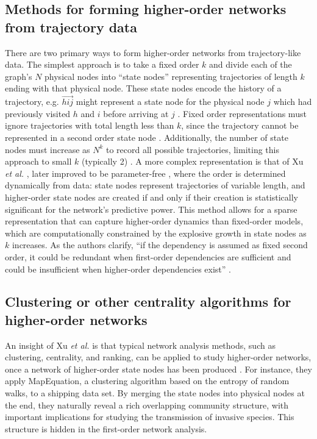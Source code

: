 \documentclass[sigconf]{acmart}
\begin{document}
\subsection{Methods for forming higher-order networks from trajectory data}

There are two primary ways to form higher-order networks from trajectory-like data. The simplest approach is to take a fixed order $k$ and divide each of the graph's $N$ physical nodes into ``state nodes'' representing trajectories of length $k$ ending with that physical node. These state nodes encode the history of a trajectory, e.g. $\vec{hij}$ might represent a state node for the physical node $j$ which had previously visited $h$ and $i$ before arriving at $j$ \cite{Rosvall2014}. Fixed order representations must ignore trajectories with total length less than $k$, since the trajectory cannot be represented in a second order state node \cite{Rosvall2014}. Additionally, the number of state nodes must increase as $N^k$ to record all possible trajectories, limiting this approach to small $k$ (typically 2) \cite{Rosvall2014}. A more complex representation is that of Xu \textit{et al.} \cite{Xu2016}, later improved to be parameter-free \cite{Xu2017}, where the order is determined dynamically from data: state nodes represent trajectories of variable length, and higher-order state nodes are created if and only if their creation is statistically significant for the network's predictive power. This method allows for a sparse representation that can capture higher-order dynamics than fixed-order models, which are computationally constrained by the explosive growth in state nodes as $k$ increases. As the authors clarify, ``if the dependency is assumed as fixed second order, it could be redundant when first-order dependencies are sufficient and could be insufficient when higher-order dependencies exist'' \cite{Xu2016}.

\subsection{Clustering or other centrality algorithms for higher-order networks} 

An insight of Xu \textit{et al.} is that typical network analysis methods, such as clustering, centrality, and ranking, can be applied to study higher-order networks, once a network of higher-order state nodes has been produced \cite{Xu2016}. For instance, they apply MapEquation, a clustering algorithm based on the entropy of random walks, to a shipping data set. By merging the state nodes into physical nodes at the end, they naturally reveal a rich overlapping community structure, with important implications for studying the transmission of invasive species. This structure is hidden in the first-order network analysis.
\end{document}
